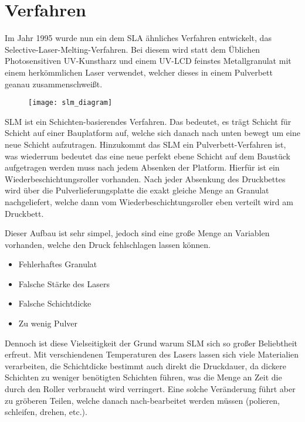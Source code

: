 \documentclass[main.tex]{subfiles}
\begin{document}
\section{Verfahren}
Im Jahr 1995 wurde nun ein dem SLA ähnliches Verfahren entwickelt, das Selective-Laser-Melting-Verfahren. Bei diesem wird statt dem Üblichen Photosensitiven UV-Kunstharz und einem UV-LCD feinstes Metallgranulat mit einem herkömmlichen Laser verwendet, welcher dieses in einem Pulverbett geanau zusammenschweißt. \parencite{3FAKTUR_1}
\begin{figure}[H]
\begin{center}
	\texttt{[image: slm\_diagram]}
	\label{img:slm_diagram}
\end{center}
\end{figure}	
SLM ist ein Schichten-basierendes Verfahren. Das bedeutet, es trägt Schicht für Schicht auf
einer Bauplatform auf, welche sich danach nach unten bewegt um eine neue Schicht aufzutragen. 
Hinzukommt das SLM ein Pulverbett-Verfahren ist, was wiederrum bedeutet das eine neue perfekt ebene Schicht auf dem Baustück aufgetragen werden muss nach jedem Absenken der Platform.
Hierfür ist ein Wiederbeschichtungsroller vorhanden. Nach jeder Absenkung des Druckbettes wird über die Pulverlieferungsplatte die exakt gleiche Menge an Granulat nachgeliefert, welche dann vom Wiederbeschichtungsroller eben verteilt wird am Druckbett. 

Dieser Aufbau ist sehr simpel, jedoch sind eine große Menge an Variablen vorhanden, welche den Druck fehlschlagen lassen können.
\begin{itemize}
\item Fehlerhaftes Granulat
\item Falsche Stärke des Lasers
\item Falsche Schichtdicke
\item Zu wenig Pulver
	
\end{itemize}
Dennoch ist diese Vielseitigkeit der Grund warum SLM sich so großer Beliebtheit erfreut. Mit verschiendenen Temperaturen des Lasers lassen sich viele Materialien verarbeiten, die Schichtdicke bestimmt auch direkt die Druckdauer, da dickere Schichten zu weniger benötigten Schichten führen, was die Menge an Zeit die durch den Roller verbraucht wird verringert.
Eine solche Veränderung führt aber zu gröberen Teilen, welche danach nach-bearbeitet werden müssen (polieren, schleifen, drehen, etc.). 
\end{document}
